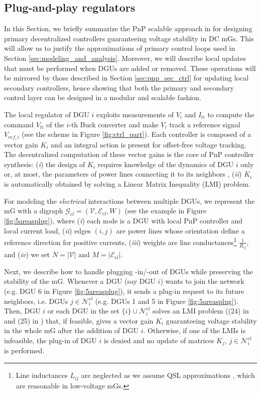 \documentclass[a4paper]{article}
\theoremstyle{plain}
\begin{document}
\subsection{Plug-and-play regulators}
\label{sec:pnp_design}
In this Section, we briefly summarize the PnP scalable approach in
\cite{tucci2015decentralized,tucci2016improved} for designing primary decentralized controllers guaranteeing
voltage stability in DC mGs. This will allow us to justify the approximations of primary control loops used in Section \ref{sec:modeling_and_analysis}. Moreover, we will describe local updates that must be performed when DGUs are added or removed. These operations will be mirrored by those described in Section \ref{sec:pnp_sec_ctrl} for updating local secondary controllers, hence showing that both the primary and secondary control layer can be designed in a modular and scalable fashion. 

The local regulator of DGU $i$
exploits measurements of $V_i$ and $I_{ti}$ to compute the command
$V_{ti}$ of the $i$-th Buck converter and make $V_{i}$ track a
reference signal $V_{ref,i}$ (see the scheme in Figure
\ref{fig:ctrl_part}). Each controller is composed of a vector
gain $K_i$ and an integral action is present for offset-free voltage
tracking. The decentralized computation of these vector gains is the
core of PnP controller synthesis: (\textit{i}) the design of $K_{i}$ requires
knowledge of the dynamics of DGU $i$ only \cite{tucci2016improved} or, at most, the parameters of power lines connecting it to its neighbors \cite{tucci2015decentralized}, (\textit{ii}) $K_i$ is automatically
obtained by solving a Linear Matrix Inequality (LMI) problem.

For modeling the \textit{electrical} interactions between multiple DGUs, we represent the mG
with a digraph $\mathcal{G}_{el}=(\mathcal{V}, \mathcal{E}_{el}, W)$ (see the example in Figure \ref{fig:5areasplug}), where (\textit{i}) each node is a DGU with
local PnP controller and local current load, (\textit{ii}) edges $(i,j)$ are
power lines whose orientation define a reference direction for
positive currents, (\textit{iii}) weights are line conductances\footnote{Line inductances $L_{ij}$ are neglected as we assume QSL approximations \cite{tucci2015decentralized, tucci2016improved}, which are reasonable in low-voltage mGs.} $\frac{1}{R_{ij}}$, and
(\textit{iv}) we set $N = |\mathcal{V}| $ and $M = |\mathcal{E}_{el}|$. 

Next, we describe how to handle plugging -in/-out of DGUs while preserving
the stability of the mG. Whenever a DGU (say DGU $i$) wants to join
the network (e.g. DGU 6 in Figure \ref{fig:5areasplug}), it sends a
plug-in request to its future neighbors, i.e. DGUs $j\in\mathcal{N}^{el}_i$
(e.g. DGUs 1 and 5 in Figure \ref{fig:5areasplug}). Then, DGU $i$ \cite{tucci2016improved} or each DGU in
the set $\{i\}\cup \mathcal{N}^{el}_i$ \cite{tucci2015decentralized} solves an LMI problem ((24) in
\cite{tucci2016improved} and (25) in \cite{tucci2015decentralized}) that, if feasible, gives a vector gain
$K_i$ guaranteeing voltage stability in the whole mG after the
addition of DGU $i$. Otherwise, if one of the LMIs is infeasible, the
plug-in of DGU $i$ is denied and no update of matrices $K_j$,
$j\in\mathcal{N}^{el}_i$ is performed. 
\end{document}
